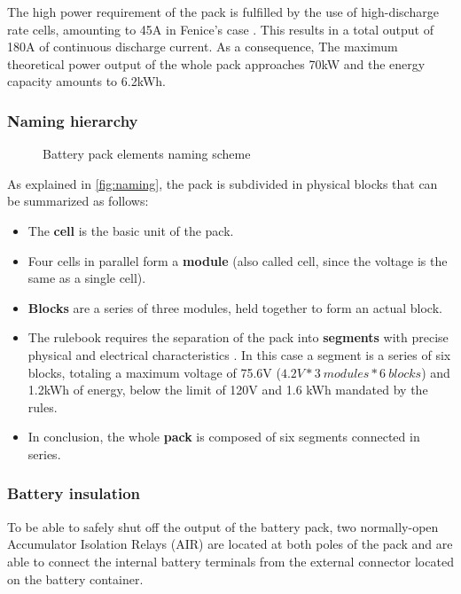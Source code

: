 The high power requirement of the pack is fulfilled by the use of high-discharge rate cells, amounting to 45A in Fenice's case \cite{inr21700-40t}. This results in a total output of 180A of continuous discharge current. As a consequence, The maximum theoretical power output of the whole pack approaches 70kW and the energy capacity amounts to 6.2kWh.

\subsubsection{Naming hierarchy}
\begin{figure}[h]
    \centering
    \resizebox{\textwidth}{!}{%
    }
    \caption{Battery pack elements naming scheme}
    \label{fig:naming}
\end{figure}

As explained in \autoref{fig:naming}, the pack is subdivided in physical blocks that can be summarized as follows:

\begin{itemize}
    \item The \textbf{cell} is the basic unit of the pack.
    \item Four cells in parallel form a \textbf{module} (also called cell, since the voltage is the same as a single cell).
    \item \textbf{Blocks} are a series of three modules, held together to form an actual block.
    \item The rulebook requires the separation of the pack into \textbf{segments} with precise physical and electrical characteristics \cite[EV 5.3.2]{fsg2020}. In this case a segment is a series of six blocks, totaling a maximum voltage of 75.6V ($4.2V*3\ modules*6\ blocks$) and 1.2kWh of energy, below the limit of 120V and 1.6 kWh mandated by the rules.
    \item In conclusion, the whole \textbf{pack} is composed of six segments connected in series.
\end{itemize}


\subsubsection{Battery insulation}
To be able to safely shut off the output of the battery pack, two normally-open Accumulator Isolation Relays (AIR) \cite[EV 5.6]{fsg2020} are located at both poles of the pack and are able to connect the internal battery terminals from the external connector located on the battery container.

